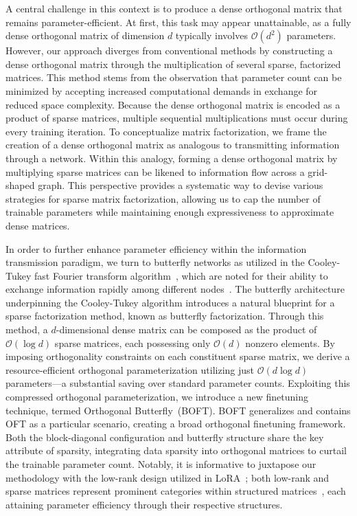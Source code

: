 A central challenge in this context is to produce a dense orthogonal matrix that remains parameter-efficient. At first, this task may appear unattainable, as a fully dense orthogonal matrix of dimension $d$ typically involves $\mathcal{O}(d^2)$ parameters. However, our approach diverges from conventional methods by constructing a dense orthogonal matrix through the multiplication of several sparse, factorized matrices. This method stems from the observation that parameter count can be minimized by accepting increased computational demands in exchange for reduced space complexity. Because the dense orthogonal matrix is encoded as a product of sparse matrices, multiple sequential multiplications must occur during every training iteration. To conceptualize matrix factorization, we frame the creation of a dense orthogonal matrix as analogous to transmitting information through a network. Within this analogy, forming a dense orthogonal matrix by multiplying sparse matrices can be likened to information flow across a grid-shaped graph. This perspective provides a systematic way to devise various strategies for sparse matrix factorization, allowing us to cap the number of trainable parameters while maintaining enough expressiveness to approximate dense matrices.

In order to further enhance parameter efficiency within the information transmission paradigm, we turn to butterfly networks as utilized in the Cooley-Tukey fast Fourier transform algorithm~\cite{cooley1965algorithm}, which are noted for their ability to exchange information rapidly among different nodes~\cite{klasing1994broadcasting}. The butterfly architecture underpinning the Cooley-Tukey algorithm introduces a natural blueprint for a sparse factorization method, known as butterfly factorization. Through this method, a $d$-dimensional dense matrix can be composed as the product of $\mathcal{O}(\log d)$ sparse matrices, each possessing only $\mathcal{O}(d)$ nonzero elements. By imposing orthogonality constraints on each constituent sparse matrix, we derive a resource-efficient orthogonal parameterization utilizing just $\mathcal{O}(d\log d)$ parameters—a substantial saving over standard parameter counts. Exploiting this compressed orthogonal parameterization, we introduce a new finetuning technique, termed Orthogonal Butterfly~(BOFT). BOFT generalizes and contains OFT as a particular scenario, creating a broad orthogonal finetuning framework. Both the block-diagonal configuration and butterfly structure share the key attribute of sparsity, integrating data sparsity into orthogonal matrices to curtail the trainable parameter count. Notably, it is informative to juxtapose our methodology with the low-rank design utilized in LoRA~\cite{hulora2022}; both low-rank and sparse matrices represent prominent categories within structured matrices~\cite{candes2011robust}, each attaining parameter efficiency through their respective structures.

